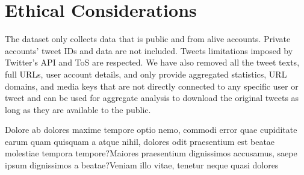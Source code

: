 \documentclass[letterpaper]{article}
\begin{document}
\section{Ethical Considerations}
The dataset only collects data that is public and from alive accounts. Private accounts' tweet IDs and data are not included. Tweets limitations imposed by Twitter's API and ToS are respected. We have also removed all the tweet texts, full URLs, user account details, and only provide aggregated statistics, URL domains, and media keys that are not directly connected to any specific user or tweet and can be used for aggregate analysis to download the original tweets as long as they are available to the public.



Dolore ab dolores maxime tempore optio nemo, commodi error quae cupiditate earum quam quisquam a atque nihil, dolores odit praesentium est beatae molestiae tempora tempore?Maiores praesentium dignissimos accusamus, saepe ipsum dignissimos a beatae?Veniam illo vitae, tenetur neque quasi dolores

\end{document}
